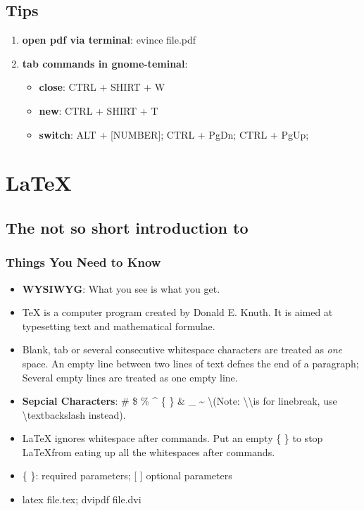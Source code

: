 \documentclass[11pt,twoside,a4paper]{article}
\begin{document}
\subsection{Tips} %
\begin{enumerate}
  \item \textbf{open pdf via terminal}: evince file.pdf
  \item \textbf{tab commands in gnome-teminal}:
    \begin{itemize}
      \item \textbf{close}: CTRL + SHIRT + W
      \item \textbf{new}: CTRL + SHIRT + T
      \item \textbf{switch}: ALT + [NUMBER]; CTRL + PgDn; CTRL + PgUp;
    \end{itemize}
\end{enumerate}
\newpage


\section{\LaTeX} %
\subsection{The not so short introduction to \LaTeXe} %
\subsubsection{Things You Need to Know} %
\begin{itemize}
  \item \textbf{WYSIWYG}: What you see is what you get.
  \item \TeX{} is a computer program created by Donald E. Knuth. It is aimed at typesetting text and mathematical formulae.
  \item Blank, tab or several consecutive whitespace characters are treated as \textit{one} space. An empty line between two lines of text defnes the end of a paragraph; Several empty lines are treated as one empty line.
  \item \textbf{Sepcial Characters}: \# \$ \% \^{} \{ \} \& \_ \~{} \textbackslash (Note: \textbackslash\textbackslash is for linebreak, use \textbackslash textbackslash instead).
  \item \LaTeX{} ignores whitespace after commands. Put an empty \{ \} to stop \LaTeX from eating up all the whitespaces after commands.
  \item \{ \}: required parameters; [ ] optional parameters
  \item latex file.tex; dvipdf file.dvi
\end{itemize}
\end{document}
